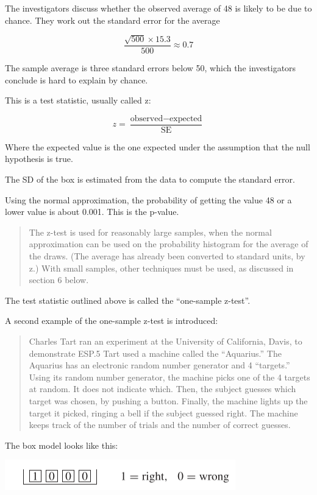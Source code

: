\documentclass[
]{book}
\begin{document}
The investigators discuss whether the observed average of 48 is likely to be due to chance. They work out the standard error for the average

\[
\frac{\sqrt{500} \times 15.3}{500}\approx 0.7 
\]

The sample average is three standard errors below 50, which the investigators conclude is hard to explain by chance.

This is a test statistic, usually called z:

\[
z = \frac{\text{observed} - \text{expected}}{\text{SE}}
\]

Where the expected value is the one expected under the assumption that the null hypothesis is true.

The SD of the box is estimated from the data to compute the standard error.

Using the normal approximation, the probability of getting the value 48 or a lower value is about 0.001. This is the p-value.

\begin{quote}
The z-test is used for reasonably large samples, when the normal approximation can be used on the probability histogram for the average of the draws. (The average has already been converted to standard units, by z.) With small samples, other techniques must be used, as discussed in section 6 below.
\end{quote}

The test statistic outlined above is called the ``one-sample z-test''.

A second example of the one-sample z-test is introduced:

\begin{quote}
Charles Tart ran an experiment at the University of California, Davis, to demonstrate ESP.5 Tart used a machine called the ``Aquarius.'' The Aquarius has an electronic random number generator and 4 ``targets.'' Using its random number generator, the machine picks one of the 4 targets at random. It does not indicate which. Then, the subject guesses which target was chosen, by pushing a button. Finally, the machine lights up the target it picked, ringing a bell if the subject guessed right. The machine keeps track of the number of trials and the number of correct guesses.
\end{quote}

The box model looks like this:

\includegraphics{images/Ch26Img01.png}
\end{document}
